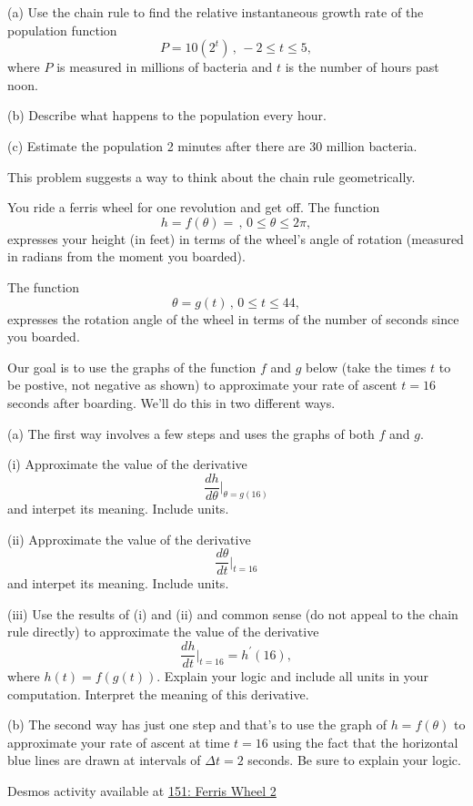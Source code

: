 \documentclass{ximera}
\begin{document}
\begin{example}  \label{Ex:CHHODDrer}
 (a) Use the chain rule to find the relative instantaneous growth rate of the population function
\[
      P = 10 (2^t)  \, , \, -2\leq t \leq 5 ,
\]
where $P$ is measured in millions of bacteria and $t$ is the number of hours past noon.

(b) Describe what happens to the population every hour.

(c) Estimate the population 2 minutes after there are 30 million bacteria.
\end{example}




\begin{question}  \label{Ex:CHdfthghhyhpp}
This problem suggests a way to think about the chain rule geometrically.

You ride a ferris wheel for one revolution and get off. The function 
\[
    h = f(\theta) = \, , \, 0\leq \theta \leq 2\pi ,   %
\]
expresses your height (in feet) in terms of the wheel's angle of rotation (measured in radians from the moment you boarded).

The function 
\[
    \theta = g(t) \, , \, 0\leq t \leq 44, 
\]
expresses the rotation angle of the wheel in terms of the number of seconds since  you boarded.

Our goal is to use the graphs of the function $f$ and $g$ below (take the times $t$ to be postive, not negative as shown) to approximate your rate of ascent $t=16$ seconds after boarding. We'll do this in two different ways.

(a) The first way involves a few steps and uses the graphs of both $f$ and $g$. 

(i) Approximate the value of the derivative
\[
   \frac{dh}{d\theta}\Big|_{\theta = g(16)} 
\]
and interpet its meaning. Include units.

(ii) Approximate the value of the derivative 
\[
    \frac{d\theta}{dt}\Big|_{t=16} 
\]
and interpet its meaning. Include units.

(iii) Use the results of (i) and (ii) and common sense (do not appeal to the chain rule directly) to approximate the value of the derivative
\[
   \frac{dh}{dt}\Big|_{t=16}  =  h^\prime(16),
\]
where $h(t) = f(g(t))$. Explain your logic and include all units in your computation. Interpret the meaning of this derivative.

(b) The second way has just one step and that's to use the graph of $h=f(\theta)$ to approximate your rate of ascent at time $t=16$ using the fact that the horizontal blue lines are drawn at intervals of $\Delta t = 2$ seconds. Be sure to explain your logic.


\begin{onlineOnly}
    \begin{center}
\end{center}
\end{onlineOnly}

Desmos activity available at \href{https://www.desmos.com/calculator/fkgfpsowe8}{151: Ferris Wheel 2}

\end{question}
\end{document}
